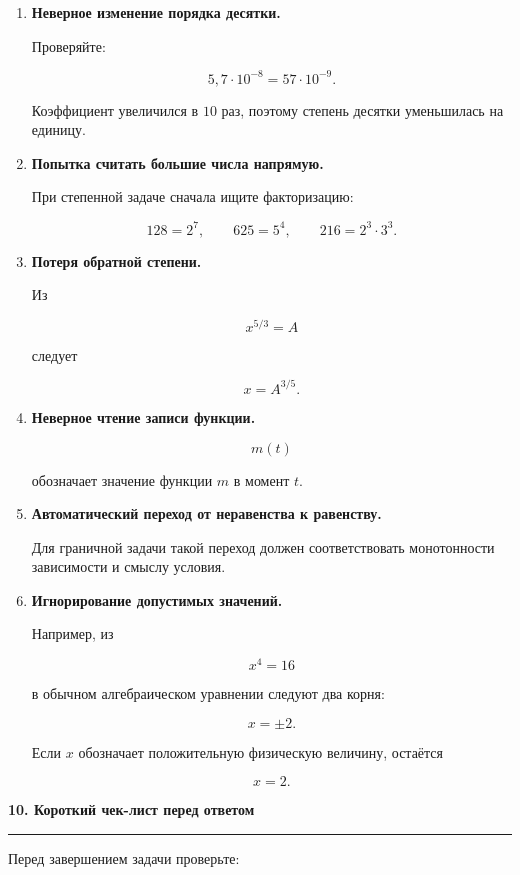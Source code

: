 \documentclass[a4paper,12pt]{article}
\newcommand{\topic}[1]{%
  \vspace{0.5em}
  {\Large\bfseries\color{darkaccent}#1}\par
  \vspace{0.25em}
  {\color{accent}\rule{\linewidth}{0.7pt}}\par
  \vspace{0.6em}
}
\begin{document}
\begin{enumerate}

\item
\textbf{Неверное изменение порядка десятки.}

Проверяйте:

\[
5{,}7\cdot10^{-8}
=
57\cdot10^{-9}.
\]

Коэффициент увеличился в \(10\) раз, поэтому степень десятки
уменьшилась на единицу.

\item
\textbf{Попытка считать большие числа напрямую.}

При степенной задаче сначала ищите факторизацию:

\[
128=2^7,
\qquad
625=5^4,
\qquad
216=2^3\cdot3^3.
\]

\item
\textbf{Потеря обратной степени.}

Из

\[
x^{5/3}=A
\]

следует

\[
x=A^{3/5}.
\]

\item
\textbf{Неверное чтение записи функции.}

\[
m(t)
\]

обозначает значение функции \(m\) в момент \(t\).

\item
\textbf{Автоматический переход от неравенства к равенству.}

Для граничной задачи такой переход должен соответствовать
монотонности зависимости и смыслу условия.

\item
\textbf{Игнорирование допустимых значений.}

Например, из

\[
x^4=16
\]

в обычном алгебраическом уравнении следуют два корня:

\[
x=\pm2.
\]

Если \(x\) обозначает положительную физическую величину,
остаётся

\[
x=2.
\]

\end{enumerate}

\topic{10. Короткий чек-лист перед ответом}

Перед завершением задачи проверьте:
\end{document}
